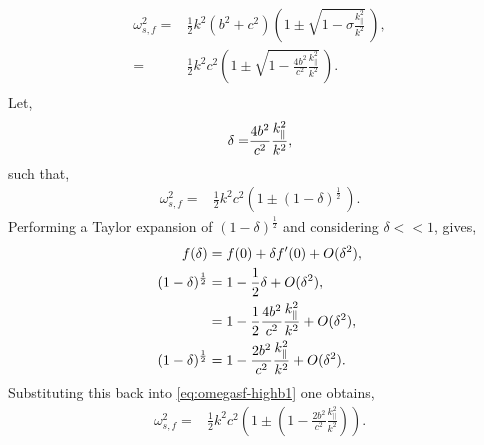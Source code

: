 \begin{align}
    \omega^2_{s,f} =& \frac{1}{2}k^2(b^2+c^2)\left(1 \pm \sqrt{1 - \sigma \frac{k^2_\parallel}{k^2}}\,\right),\\
                   =& \frac{1}{2}k^2c^2\left(1 \pm \sqrt{1 - \frac{4b^2}{c^2} \frac{k^2_\parallel}{k^2}}\,\right).\\
\end{align}
Let,
\begin{align}
    \delta =& \frac{4b^2}{c^2} \frac{k^2_\parallel}{k^2},\notag\\
\end{align}
such that,
\begin{align}
    \omega^2_{s,f} =& \frac{1}{2}k^2c^2\left(1 \pm (1 - \delta)^{\frac{1}{2}}\,\right).\label{eq:omegasf-highb1}
\end{align}
Performing a Taylor expansion of $(1-\delta)^{\frac{1}{2}}$ and considering $\delta << 1$, gives,
\begin{align}
    f(\delta) &= f(0) + \delta f^\prime(0) + O(\delta^2),\notag\\
    (1-\delta)^{\frac{1}{2}} &= 1 - \frac{1}{2}\delta + O(\delta^2),\\
                             &= 1 - \frac{1}{2}\frac{4b^2}{c^2} \frac{k^2_\parallel}{k^2} + O(\delta^2),\\
    (1-\delta)^{\frac{1}{2}} &= 1 - \frac{2b^2}{c^2} \frac{k^2_\parallel}{k^2} + O(\delta^2).
\end{align}
Substituting this back into \cref{eq:omegasf-highb1} one obtains,
\begin{align}
    \omega^2_{s,f} =& \frac{1}{2}k^2c^2\left(1 \pm \left(1 - \frac{2b^2}{c^2} \frac{k^2_\parallel}{k^2}\right)\right).
\end{align}

